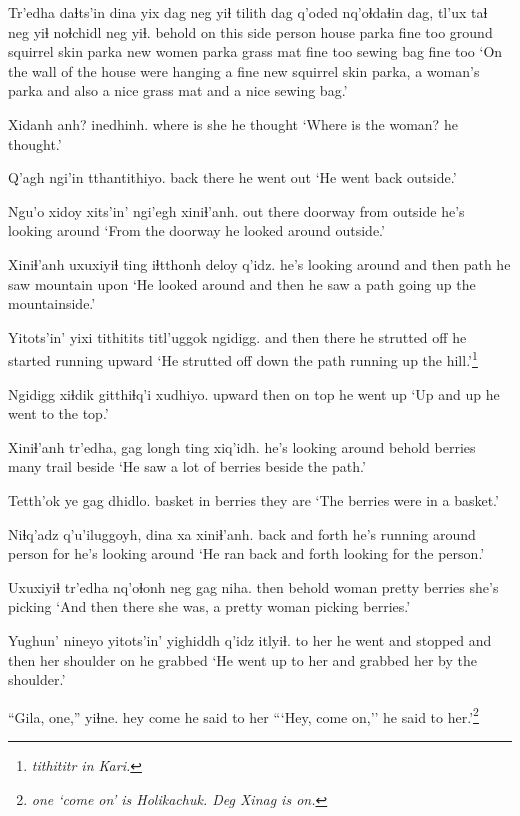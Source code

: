 \documentclass[12pt]{article}
\begin{document}
\gll Tr'edha daɬts'in dina yix dag neg yiɬ tilith  dag q'oded nq'oɬdaɬin dag, tl'ux taɬ neg yiɬ noɬchidl neg yiɬ.
behold  {on this side} person house parka fine too {ground squirrel skin} parka new women parka grass mat fine too {sewing bag}  fine too
\glt `On the wall of the house were hanging a fine new squirrel skin parka, a woman's parka and also a nice grass mat and a nice sewing bag.'
\glend

\gll Xidanh anh? inedhinh.
{where is} she {he thought}
\glt `Where is the woman? he thought.'
\glend

\gll Q'agh ngi'in tthantithiyo.
back  there {he went out}
\glt `He went back outside.'
\glend

\gll Ngu'o  xidoy xits'in' ngi'egh xiniɬ'anh.
{out there} doorway from  outside  {he's looking around}
\glt `From the doorway he looked around outside.'
\glend

\gll Xiniɬ'anh uxuxiyiɬ ting iɬtthonh deloy  q'idz.
{he's looking around} {and then} path {he saw}  mountain upon
\glt `He looked around and then he saw a path going up the mountainside.'
\glend

\gll Yitots'in' yixi tithitits titl'uggok  ngidigg.
{and then} there {he strutted off} {he started running} upward
\glt `He strutted off down the path running up the hill.'\footnote{\em tithititr \em in Kari.}
\glend

\gll Ngidigg xiɬdik  gitthiɬq'i xudhiyo.
upward  then  {on top}  {he went up}
\glt `Up and up he went to the top.'
\glend

\gll Xiniɬ'anh tr'edha, gag  longh ting xiq'idh.
{he's looking around} behold  berries  many trail beside
\glt `He saw a lot of berries beside the path.'
\glend

\gll Tetth'ok ye gag  dhidlo.
basket  in berries  {they are}
\glt `The berries were in a basket.'
\glend

\gll Niɬq'adz  q'u'iluggoyh, dina  xa xiniɬ'anh.
{back and forth}  {he's running around} person  for {he's looking around}
\glt `He ran back and forth looking for the person.'
\glend

\gll Uxuxiyiɬ tr'edha nq'oɬonh neg gag  niha.
then  behold  woman  pretty berries  {she's picking}
\glt `And then there she was, a pretty woman picking berries.'
\glend

\gll Yughun' nineyo yitots'in' yighiddh q'idz itlyiɬ.
{to her} {he went and stopped} {and then} {her shoulder} on {he grabbed}
\glt `He went up to her and grabbed her by the shoulder.'
\glend

\gll ``Gila, one,'' yiɬne.
hey  come {he said to her}
\glt ```Hey, come on,'' he said to her.'\footnote{\em one \em `come on' is Holikachuk. Deg Xinag is \em on.}
\glend
\end{document}
